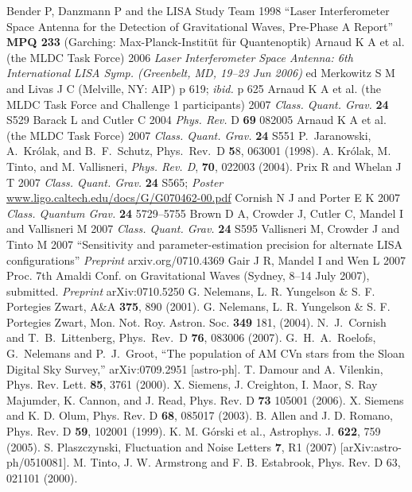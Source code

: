 \documentclass{iopart}
\begin{document}
\begin{thebibliography}{99}
%
 Bender P, Danzmann P and the LISA Study Team 1998 ``Laser Interferometer Space Antenna for the Detection of Gravitational Waves, Pre-Phase A Report'' \textbf{MPQ 233} (Garching: Max-Planck-Instit\"ut f\"ur Quantenoptik) 
%
 Arnaud K A et al. (the MLDC Task Force) 2006 \textit{Laser Interferometer Space Antenna: 6th International LISA Symp. (Greenbelt, MD, 19--23 Jun 2006)} ed Merkowitz S M and Livas J C (Melville, NY: AIP) p 619; \textit{ibid.} p 625
%
 Arnaud K A et al. (the MLDC Task Force and Challenge 1 participants) 2007 \textit{Class. Quant. Grav.} \textbf{24} S529
%
 Barack L and Cutler C 2004 \textit{Phys. Rev.} D \textbf{69} 082005
%
 Arnaud K A et al. (the MLDC Task Force) 2007 \textit{Class. Quant. Grav.} \textbf{24} S551
%
P.\ Jaranowski, A.\ Kr\'olak, and B.\ F.\ Schutz, Phys.\ Rev.\ D
{\textbf 58}, 063001 (1998).
%
 A. Kr\'olak, M. Tinto, and M. Vallisneri, {\it Phys. Rev. D}, {\bf 70},
022003 (2004).
%
 Prix R and Whelan J T 2007 \textit{Class. Quant. Grav.} \textbf{24} S565; \textit{Poster} \url{www.ligo.caltech.edu/docs/G/G070462-00.pdf}
%
 Cornish N J and Porter E K 2007 \textit{Class. Quantum Grav.} \textbf{24} 5729--5755
%
 Brown D A, Crowder J, Cutler C, Mandel I and Vallisneri M 2007 \textit{Class. Quant. Grav.} \textbf{24} S595
%
 Vallisneri M, Crowder J and Tinto M 2007 ``Sensitivity and parameter-estimation precision for alternate LISA configurations'' \textit{Preprint} arxiv.org/0710.4369 
%
 Gair J R, Mandel I and Wen L 2007 Proc. 7th Amaldi Conf. on Gravitational Waves (Sydney, 8--14 July 2007), submitted. \textit{Preprint} arXiv:0710.5250
%
 G. Nelemans, L. R. Yungelson \& S. F. Portegies Zwart, A\&A {\bf 375}, 890 (2001).
%
 G. Nelemans, L. R. Yungelson \& S. F. Portegies Zwart, Mon. Not. Roy. Astron. Soc.
{\bf 349} 181, (2004).
%
 N.~J.~Cornish and T.~B.~Littenberg, Phys.\ Rev.\ D {\bf 76}, 083006 (2007).
%
 G.~H.~A.~Roelofs, G.~Nelemans and P.~J.~Groot,
``The population of AM CVn stars from the Sloan Digital Sky Survey,''
arXiv:0709.2951 [astro-ph].
%
 T. Damour and A. Vilenkin, Phys. Rev. Lett. {\bf 85}, 3761 (2000).
%
 X. Siemens, J. Creighton, I. Maor, S. Ray Majumder,
K. Cannon, and J. Read, Phys. Rev. D {\bf 73} 105001 (2006).
%
 X. Siemens and K. D. Olum, Phys. Rev. D {\bf 68}, 085017 (2003).
%
 B. Allen and J. D. Romano, Phys. Rev. D {\bf 59}, 102001 (1999).
%
 K. M. G\'orski et al., Astrophys. J. {\bf 622}, 759 (2005).
%
 S. Plaszczynski, Fluctuation and Noise Letters {\bf 7}, R1 (2007) [arXiv:astro-ph/0510081].
%
 M. Tinto, J. W. Armstrong and F. B. Estabrook, Phys. Rev. D 63, 021101 (2000).
%
\end{thebibliography}
\end{document}
